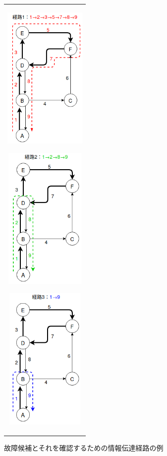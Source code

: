 \documentclass[11pt]{article}
\begin{document}
\begin{figure}[H]
   \centering
      \begin{tabular}{c}
         \begin{minipage}{0.30\hsize}
         \centering
         \includegraphics[height=7cm]{figure/route1.png}
            \label{fig:route1}
         \end{minipage}
         \begin{minipage}{0.30\hsize}
         \centering
         \includegraphics[height=7cm]{figure/route2.png}
            \label{fig:route2}
         \end{minipage}
         \begin{minipage}{0.30\hsize}
            \centering
            \includegraphics[height=7cm]{figure/route3.png}
               \label{fig:route2}
            \end{minipage}
      \end{tabular} 
      \caption{故障候補とそれを確認するための情報伝達経路の例}%
      \label{fig:route}
\end{figure}
\end{document}
